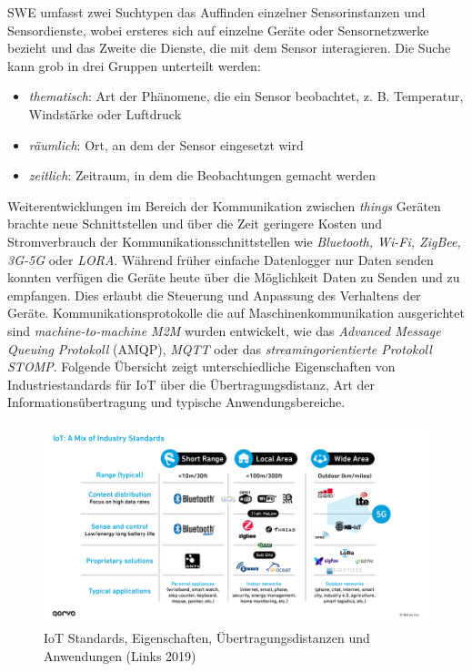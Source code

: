 \documentclass[
  11pt,
  a4paper,
  oneside, openany  ,captions=tableheading
]{scrbook}
\providecommand{\tightlist}{%
  \setlength{\itemsep}{0pt}\setlength{\parskip}{0pt}}
\theoremstyle{remark}
\begin{document}
SWE umfasst zwei Suchtypen das Auffinden einzelner Sensorinstanzen und
Sensordienste, wobei ersteres sich auf einzelne Geräte oder
Sensornetzwerke bezieht und das Zweite die Dienste, die mit dem Sensor
interagieren. Die Suche kann grob in drei Gruppen unterteilt werden:

\begin{itemize}
\tightlist
\item
  \emph{thematisch}: Art der Phänomene, die ein Sensor beobachtet, z. B.
  Temperatur, Windstärke oder Luftdruck
\item
  \emph{räumlich}: Ort, an dem der Sensor eingesetzt wird
\item
  \emph{zeitlich}: Zeitraum, in dem die Beobachtungen gemacht werden
\end{itemize}

Weiterentwicklungen im Bereich der Kommunikation zwischen \emph{things}
Geräten brachte neue Schnittstellen und über die Zeit geringere Kosten
und Stromverbrauch der Kommunikationsschnittstellen wie \emph{Bluetooth,
Wi-Fi, ZigBee, 3G-5G} oder \emph{LORA}. Während früher einfache
Datenlogger nur Daten senden konnten verfügen die Geräte heute über die
Möglichkeit Daten zu Senden und zu empfangen. Dies erlaubt die Steuerung
und Anpassung des Verhaltens der Geräte. Kommunikationsprotokolle die
auf Maschinenkommunikation ausgerichtet sind \emph{machine-to-machine
M2M} wurden entwickelt, wie das \emph{Advanced Message Queuing
Protokoll} (AMQP), \emph{MQTT} oder das \emph{streamingorientierte
Protokoll STOMP}. Folgende Übersicht zeigt unterschiedliche
Eigenschaften von Industriestandards für IoT über die
Übertragungsdistanz, Art der Informationsübertragung und typische
Anwendungsbereiche.

\begin{figure}[H]

{\centering \includegraphics{images/iot_standards_range.png}

}

\caption{IoT Standards, Eigenschaften, Übertragungsdistanzen und
Anwendungen (Links 2019)}

\end{figure}%
\end{document}
